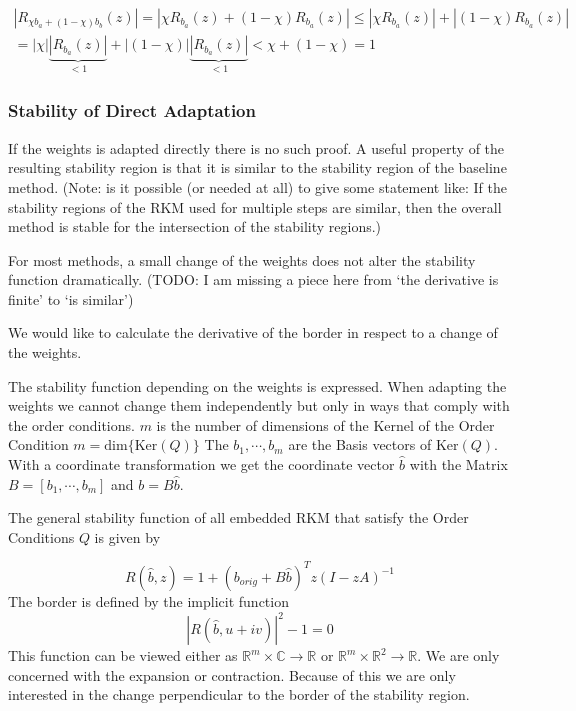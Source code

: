 \documentclass[a4paper]{scrartcl}
\numberwithin{equation}{section}
\theoremstyle{plain}
\theoremstyle{definition}
\numberwithin{theorem}{section}
\newcommand{\R}{\mathbb{R}}
\newcommand{\CN}{\mathbb{C}}
\newcommand{\1}{\mathbbm{1}}
\begin{document}
\begin{multline}
|R_{\chi b_a +(1-\chi) b_b}(z)| = |\chi R_{b_a}(z) + (1-\chi) R_{b_a}(z)| \leq |\chi R_{b_a}(z)| + |(1-\chi) R_{b_a}(z)|\\
 =| \chi| \underbrace{|R_{b_a}(z)|}_{<1} + |(1-\chi)| \underbrace{|R_{b_a}(z)|}_{<1} < \chi + (1-\chi)= 1
\end{multline}



\subsubsection{Stability of  Direct Adaptation}
If the weights is adapted directly there is no such proof.
A useful property of the resulting stability region is that it is similar to the stability region of the baseline method. 
(Note: is it possible (or needed at all) to give some statement like: If the stability regions of the RKM used for multiple steps are similar, then the overall method is stable for the intersection of the stability regions.)

For most methods, a small change of the weights does not alter the stability function dramatically.
(TODO: I am missing a piece here from ‘the derivative is finite’ to ‘is similar’)

We would like to calculate the derivative of the border in respect to a change of the weights. 

The stability function depending on the weights is expressed. 
When adapting the weights we cannot change them independently but only in ways that comply with the order conditions.
$m$ is the number of dimensions of the Kernel of the Order Condition $m = \mathrm{dim}\{\mathrm{Ker} (Q) \}$
The $b_1,\cdots,b_m$  are the Basis vectors of $\mathrm{Ker} (Q)$. With a coordinate transformation we get the coordinate vector $\hat{b}$ with the Matrix $B = [b_1,\cdots,b_m]$ and $b = B \hat{b}$.

The general stability function of all embedded RKM that satisfy the Order Conditions $Q$ is given by 

\begin{equation}\label{eq:gen_stabilityf}
R(\hat{b},z) = 1 +  (b_{orig} +B \hat{b})^T z(I - zA)^{-1}
\end{equation}
The border is defined by the implicit function 
\begin{equation}\label{eq:border}
|R(\hat{b},u+iv)|^2 -1 = 0
\end{equation}
This function can be viewed either as $\R^m \times  \CN \rightarrow \R$ or $\R^m \times  \R^2 \rightarrow \R$.
We are only concerned with the expansion or contraction. Because of this we are only interested in the change perpendicular to the border of the stability region. 
\end{document}
